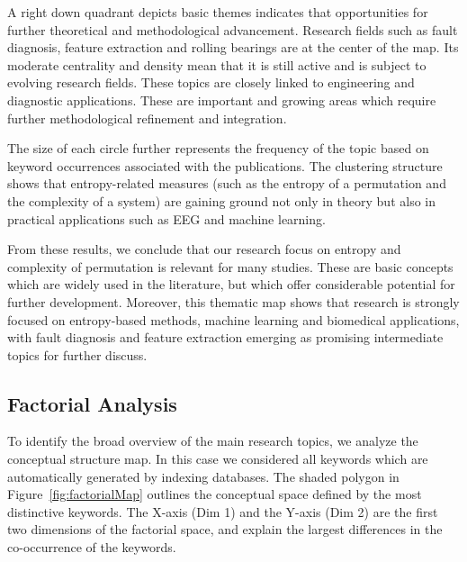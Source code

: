 A right down quadrant depicts basic themes indicates that opportunities for further theoretical and methodological advancement. 
Research fields such as fault diagnosis, feature extraction and rolling bearings are at the center of the map. Its moderate centrality and density mean that it is still active and is subject to evolving research fields. These topics are closely linked to engineering and diagnostic applications. These are important and growing areas which require further methodological refinement and integration.

The size of each circle further represents the frequency of the topic based on keyword occurrences associated with the publications. The clustering structure shows that entropy-related measures (such as the entropy of a permutation and the complexity of a system) are gaining ground not only in theory but also in practical applications such as EEG and machine learning.

From these results, we conclude that our research focus on entropy and complexity of permutation is relevant for many studies. These are basic concepts which are widely used in the literature, but which offer considerable potential for further development. Moreover, this thematic map shows that research is strongly focused on entropy-based methods, machine learning and biomedical applications, with fault diagnosis and feature extraction emerging as promising intermediate topics for further discuss.


\subsection{Factorial Analysis}
To identify the broad overview of the main research topics, we analyze the conceptual structure map. In this case we considered all keywords which are automatically generated by indexing databases. The shaded polygon in Figure~\ref{fig:factorialMap}  outlines the conceptual space defined by the most distinctive keywords. The X-axis (Dim 1) and the Y-axis (Dim 2) are the first two dimensions of the factorial space, and explain the largest differences in the co-occurrence of the keywords.

